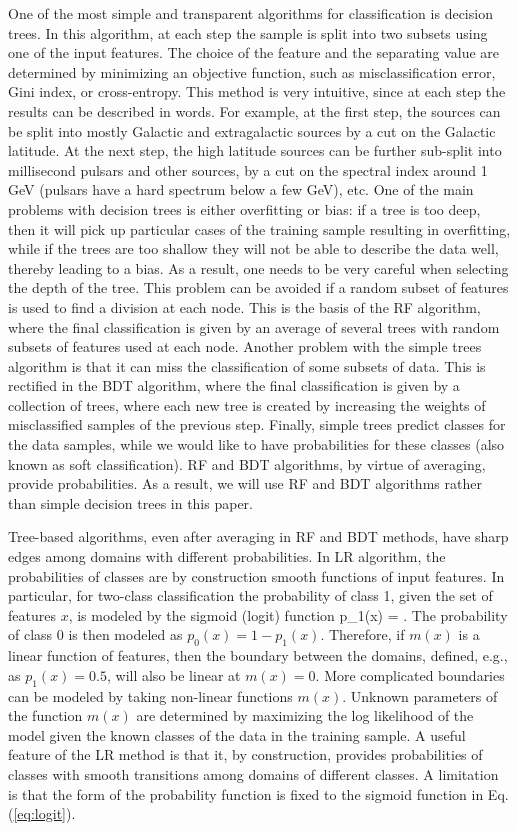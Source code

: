 One of the most simple and transparent algorithms for classification is decision trees.
In this algorithm, at each step the sample is split into two subsets using one of the input features.
The choice of the feature and the separating value are determined by minimizing an objective function, such as misclassification
error, Gini index, or cross-entropy.
This method is very intuitive, since at each step the results can be described in words. 
For example, at the first step, the sources can be split into mostly Galactic and extragalactic sources by a cut on the Galactic latitude.
At the next step, the high latitude sources can be further sub-split into millisecond pulsars and other sources, by a cut on the spectral index around 1 GeV (pulsars have a hard spectrum below a few GeV), etc.
One of the main problems with decision trees is either overfitting or bias: if a tree is too deep, then it will pick up particular cases of the training sample resulting in overfitting, while if the trees are too shallow they will not be able to describe the data well, thereby leading to a bias. 
As a result, one needs to be very careful when selecting the depth of the tree.
This problem can be avoided if a random subset of features is used to find a division at each node. This is the basis of the RF algorithm,
where the final classification is given by an average of several trees with random subsets of features used at each node.
Another problem with the simple trees algorithm is that it can miss the classification of some subsets of data. This is rectified in the BDT algorithm, where the final classification is given by a collection of trees, where each new tree is created by increasing the weights of misclassified samples of the previous step. 
Finally, simple trees predict classes for the data samples, while we would like to have probabilities for these classes (also known as soft classification).
RF and BDT algorithms, by virtue of averaging, provide probabilities. As a result, we will use RF and BDT algorithms rather than simple decision trees in this paper.

Tree-based algorithms, even after averaging in RF and BDT methods, have sharp edges among domains with different probabilities.
In LR algorithm, the probabilities of classes are by construction smooth functions of input features.
In particular, for two-class classification the probability of class 1, given the set of features $x$, is modeled by the sigmoid (logit) function
\bea
{}
p_1(x) = .
\eea
The probability of class 0 is then modeled as $p_0(x) = 1 - p_1(x)$.
Therefore, if $m(x)$ is a linear function of features, then the boundary between the domains, defined, e.g., as $p_1(x) = 0.5$, will also be linear
at $m(x) = 0$.
More complicated boundaries can be modeled by taking non-linear functions $m(x)$.
Unknown parameters of the function $m(x)$ are determined by maximizing the log likelihood of the model given the known classes of the data in the training sample.
A useful feature of the LR method is that it, by construction, provides probabilities of classes with smooth transitions among domains of different classes.
A limitation is that the form of the probability function is fixed to the sigmoid function in Eq. (\ref{eq:logit}).

